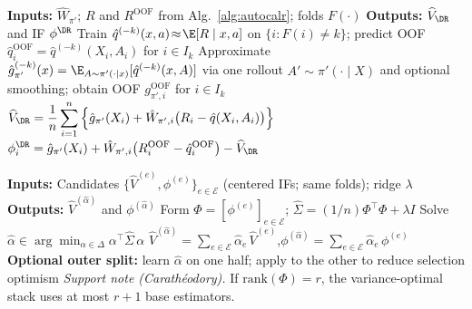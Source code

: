 \begin{algorithm}[t]
\caption{\textsc{Calibrated-DR}: sequence-aware doubly robust estimator (cross-fitted)}
\label{alg:drcpo}
\begin{algorithmic}[1]
\STATE \textbf{Inputs:} $\hat W_{\pi'}$; $R$ and $R^{\mathrm{OOF}}$ from Alg.~\ref{alg:autocalr}; folds $F(\cdot)$
\STATE \textbf{Outputs:} $\widehat V_{\DR}$ and IF $\phi^{\DR}$
  \STATE Train $\hat q^{(-k)}(x,a)\!\approx\!\E[R\mid x,a]$ on $\{i:F(i)\neq k\}$; predict OOF $\hat q^{\mathrm{OOF}}_i=\hat q^{(-k)}(X_i,A_i)$ for $i\in I_k$
  \STATE Approximate $\hat g^{(-k)}_{\pi'}(x)=\E_{A\sim \pi'(\cdot\mid x)}[\hat q^{(-k)}(x,A)]$ via one rollout $A'\sim\pi'(\cdot\mid X)$ and optional smoothing; obtain OOF $g^{\mathrm{OOF}}_{\pi',i}$ for $i\in I_k$
\ENDFOR
\STATE $\displaystyle \widehat V_{\DR}=\frac{1}{n}\sum_{i=1}^n \left\{ \hat g_{\pi'}(X_i)+\hat W_{\pi',i}\big(R_i-\hat q(X_i,A_i)\big)\right\}$
\STATE $\displaystyle \phi^{\DR}_i=\hat g_{\pi'}(X_i)+\hat W_{\pi',i}\big(R^{\mathrm{OOF}}_i-\hat q^{\mathrm{OOF}}_i\big)-\widehat V_{\DR}$
\end{algorithmic}
\end{algorithm}

\begin{algorithm}[t]
\caption{\textsc{Influence-Function Stacking}: variance-optimal convex ensembling in influence-function space}
\label{alg:ifstack}
\begin{algorithmic}[1]
\STATE \textbf{Inputs:} Candidates $\{\widehat V^{(e)},\phi^{(e)}\}_{e\in\mathcal E}$ (centered IFs; same folds); ridge $\lambda$
\STATE \textbf{Outputs:} $\widehat V^{(\hat\alpha)}$ and $\phi^{(\hat\alpha)}$
\STATE Form $\Phi=[\phi^{(e)}]_{e\in\mathcal E}$; $\hat\Sigma=(1/n)\Phi^\top\Phi+\lambda I$
\STATE Solve $\hat\alpha\in\arg\min_{\alpha\in\Delta}\alpha^\top \hat\Sigma\,\alpha$
\STATE $\widehat V^{(\hat\alpha)}=\sum_{e\in\mathcal E}\hat\alpha_e\,\widehat V^{(e)}$,\quad $\phi^{(\hat\alpha)}=\sum_{e\in\mathcal E}\hat\alpha_e\,\phi^{(e)}$
\STATE \textbf{Optional outer split:} learn $\hat\alpha$ on one half; apply to the other to reduce selection optimism
\STATE \textit{Support note (Carath\'eodory).} If $\mathrm{rank}(\Phi)=r$, the variance-optimal stack uses at most $r{+}1$ base estimators.
\end{algorithmic}
\end{algorithm}

